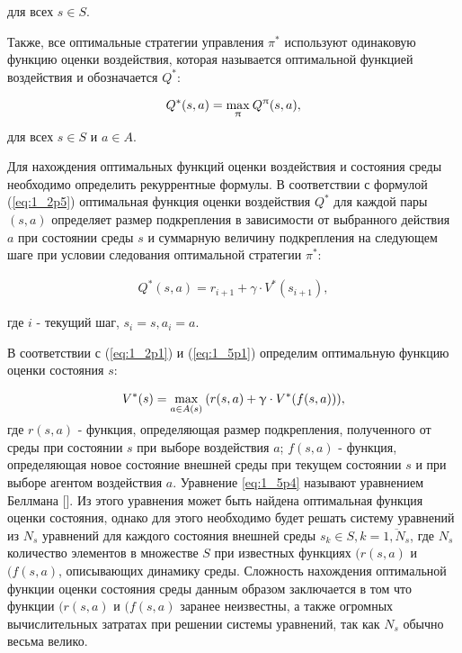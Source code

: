 \noindent для всех $ s \in S $.

Также, все оптимальные стратегии управления $ \pi^* $ используют одинаковую функцию оценки воздействия, которая называется оптимальной функцией воздействия и обозначается $ Q^* $:

\begin{equation}
\label{eq:1_5p2}
\begin{alignedat}{2}
Q^*(s, a) = \smash{\displaystyle\max_{\pi}} \: Q^{\pi}(s, a),
\end{alignedat}
\end{equation}

\noindent для всех $ s \in S $ и $ a \in A $.
 
Для нахождения оптимальных функций оценки воздействия и состояния среды необходимо определить рекуррентные формулы. В соответствии с формулой (\ref{eq:1_2p5}) оптимальная функция оценки воздействия $ Q^* $ для каждой пары $ (s, a) $ определяет размер подкрепления в зависимости от выбранного действия $ a $ при состоянии среды $ s $ и суммарную величину подкрепления на следующем шаге при условии следования оптимальной стратегии $ \pi^* $:

\begin{equation}
\label{eq:1_5p3}
\begin{alignedat}{2}
Q^*(s, a) = r_{i+1} + \gamma\cdot V^*(s_{i+1}),
\end{alignedat}
\end{equation}

\noindent где $ i $ - текущий шаг, $ s_i=s, a_i=a $.

В соответствии с (\ref{eq:1_2p1}) и (\ref{eq:1_5p1}) определим оптимальную функцию оценки состояния $ s $:  

\begin{equation}
\label{eq:1_5p4}
\begin{alignedat}{2}
V^*(s) = \smash{\displaystyle\max_{a \in A(s)}} \: (r(s, a) + \gamma \cdot V^*(f(s, a))),
\end{alignedat}
\end{equation}

\noindent где $ r(s, a) $ - функция, определяющая размер подкрепления, полученного от среды при состоянии $ s $ при выборе воздействия $ a $; $ f(s, a) $ - функция, определяющая новое состояние внешней среды при текущем состоянии $ s $ и при выборе агентом воздействия $ a $. Уравнение 
\ref{eq:1_5p4} называют уравнением Беллмана []. Из этого уравнения может быть найдена оптимальная функция оценки состояния, однако для этого необходимо будет решать систему уравнений из $ N_s $ уравнений для каждого состояния внешней среды $ s_k \in S, k=\overline{1,N_s} $, где $ N_s $ количество элементов в множестве $ S $ при известных функциях $ (r(s, a) $ и $ (f(s, a) $, описывающих динамику среды. Сложность нахождения оптимальной функции оценки состояния среды данным образом заключается в том что функции $ (r(s, a) $ и $ (f(s, a) $ заранее неизвестны, а также огромных вычислительных затратах при решении системы уравнений, так как $ N_s $ обычно весьма велико.

